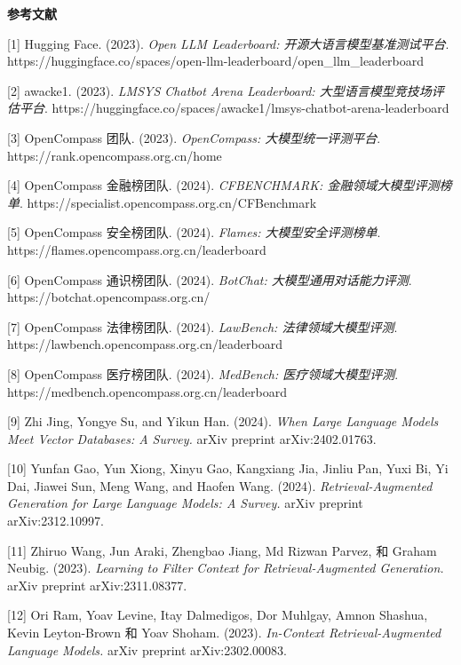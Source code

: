 \documentclass[12pt,a4paper]{book}
\begin{document}
\textbf{参考文献}

{[}1{]} Hugging Face. (2023). \emph{Open LLM Leaderboard:
开源大语言模型基准测试平台}.
https://huggingface.co/spaces/open-llm-leaderboard/open\_llm\_leaderboard

{[}2{]} awacke1. (2023). \emph{LMSYS Chatbot Arena Leaderboard:
大型语言模型竞技场评估平台}.
https://huggingface.co/spaces/awacke1/lmsys-chatbot-arena-leaderboard

{[}3{]} OpenCompass 团队. (2023). \emph{OpenCompass:
大模型统一评测平台}. https://rank.opencompass.org.cn/home

{[}4{]} OpenCompass 金融榜团队. (2024). \emph{CFBENCHMARK:
金融领域大模型评测榜单}.
https://specialist.opencompass.org.cn/CFBenchmark

{[}5{]} OpenCompass 安全榜团队. (2024). \emph{Flames:
大模型安全评测榜单}. https://flames.opencompass.org.cn/leaderboard

{[}6{]} OpenCompass 通识榜团队. (2024). \emph{BotChat:
大模型通用对话能力评测}. https://botchat.opencompass.org.cn/

{[}7{]} OpenCompass 法律榜团队. (2024). \emph{LawBench:
法律领域大模型评测}. https://lawbench.opencompass.org.cn/leaderboard

{[}8{]} OpenCompass 医疗榜团队. (2024). \emph{MedBench:
医疗领域大模型评测}. https://medbench.opencompass.org.cn/leaderboard

{[}9{]} Zhi Jing, Yongye Su, and Yikun Han. (2024). \emph{When Large
Language Models Meet Vector Databases: A Survey.} arXiv preprint
arXiv:2402.01763.

{[}10{]} Yunfan Gao, Yun Xiong, Xinyu Gao, Kangxiang Jia, Jinliu Pan,
Yuxi Bi, Yi Dai, Jiawei Sun, Meng Wang, and Haofen Wang. (2024).
\emph{Retrieval-Augmented Generation for Large Language Models: A
Survey.} arXiv preprint arXiv:2312.10997.

{[}11{]} Zhiruo Wang, Jun Araki, Zhengbao Jiang, Md Rizwan Parvez, 和
Graham Neubig. (2023). \emph{Learning to Filter Context for
Retrieval-Augmented Generation.} arXiv preprint arXiv:2311.08377.

{[}12{]} Ori Ram, Yoav Levine, Itay Dalmedigos, Dor Muhlgay, Amnon
Shashua, Kevin Leyton-Brown 和 Yoav Shoham. (2023). \emph{In-Context
Retrieval-Augmented Language Models.} arXiv preprint arXiv:2302.00083.
\end{document}
